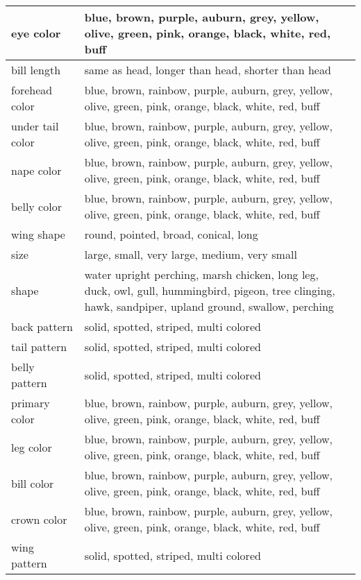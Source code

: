 \documentclass[letterpaper]{article} \usepackage{aaai23}  \usepackage{times}  \usepackage{helvet}  \usepackage{courier}  \usepackage[hyphens]{url}  \usepackage{graphicx} \urlstyle{rm} \def\UrlFont{\rm}  \usepackage{natbib}  \usepackage{caption} \frenchspacing  \setlength{\pdfpagewidth}{8.5in}  \setlength{\pdfpageheight}{11in}  \usepackage{algorithm}
\begin{document}
\begin{table}[ht]
{\begin{tabular}{p{1.8cm}|p{6.6cm}}
eye color & \makecell[l]{blue, brown, purple, auburn, grey, yellow,  \\olive, green, pink, orange, black, white, red, buff} \\\hline
 bill length & same as head, longer than head, shorter than head \\\hline
\makecell[l]{forehead \\color} & \makecell[l]{blue, brown, rainbow, purple, auburn, grey, yellow, \\olive, green, pink, orange, black, white, red, buff} \\\hline
 \makecell[l]{under tail \\color} & \makecell[l]{blue, brown, rainbow, purple, auburn, grey, yellow, \\olive, green, pink, orange, black, white, red, buff} \\ \hline
nape color & \makecell[l]{blue, brown, rainbow, purple, auburn, grey, yellow, \\olive, green, pink, orange, black, white, red, buff} \\\hline
 belly color & \makecell[l]{blue, brown, rainbow, purple, auburn, grey, yellow, \\olive, green, pink, orange, black, white, red, buff} \\ \hline
wing shape & round, pointed, broad, conical, long \\\hline
 size & large, small, very large, medium, very small \\ \hline
shape & \makecell[l]{water upright perching, marsh chicken, long leg, \\duck, owl, gull, hummingbird, pigeon, tree clinging, \\hawk, sandpiper, upland ground, swallow, perching} \\ \hline
 back pattern & solid, spotted, striped, multi colored \\\hline
tail pattern & solid, spotted, striped, multi colored \\\hline
 belly pattern & solid, spotted, striped, multi colored \\ \hline
\makecell[l]{primary \\color} & \makecell[l]{blue, brown, rainbow, purple, auburn, grey, yellow, \\olive, green, pink, orange, black, white, red, buff} \\\hline
 leg color & \makecell[l]{blue, brown, rainbow, purple, auburn, grey, yellow, \\olive, green, pink, orange, black, white, red, buff} \\ \hline
bill color & \makecell[l]{blue, brown, rainbow, purple, auburn, grey, yellow, \\olive, green, pink, orange, black, white, red, buff}  \\\hline
 crown color & \makecell[l]{blue, brown, rainbow, purple, auburn, grey, yellow, \\olive, green, pink, orange, black, white, red, buff} \\\hline
wing pattern & solid, spotted, striped, multi colored \\


\end{tabular}}
\end{table}
\end{document}
